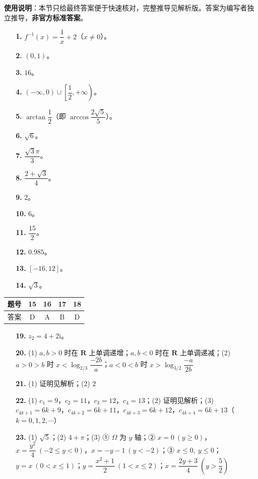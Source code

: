
\begin{gknotice}
\textbf{使用说明}：本节只给最终答案便于快速核对，完整推导见解析版。答案为编写者独立推导，\textbf{非官方标准答案}。
\end{gknotice}

\begin{itemize}[leftmargin=2.6em]
  \item[\textbf{1.}] $f^{-1}(x)=\dfrac1x+2$（$x\neq0$）。
  \item[\textbf{2.}] $(0,1)$。
  \item[\textbf{3.}] $16$。
  \item[\textbf{4.}] $(-\infty,0)\cup\left[\dfrac12,+\infty\right)$。
  \item[\textbf{5.}] $\arctan\dfrac12$（即 $\arccos\dfrac{2\sqrt5}5$）。
  \item[\textbf{6.}] $\sqrt6$。
  \item[\textbf{7.}] $\dfrac{\sqrt3\pi}3$。
  \item[\textbf{8.}] $\dfrac{2+\sqrt3}4$。
  \item[\textbf{9.}] $2$。
  \item[\textbf{10.}] $6$。
  \item[\textbf{11.}] $\dfrac{15}2$。
  \item[\textbf{12.}] $0.985$。
  \item[\textbf{13.}] $[-16,12]$。
  \item[\textbf{14.}] $\sqrt3$。
\end{itemize}

\begin{center}\begin{tabular}{ccccc}
\toprule
题号 & 15 & 16 & 17 & 18 \\
\midrule
答案 & D & A & B & D \\
\bottomrule
\end{tabular}\end{center}

\begin{itemize}[leftmargin=2.6em]
  \item[\textbf{19.}] $z_2=4+2\mathrm i$。
  \item[\textbf{20.}] (1) $a,b>0$ 时在 $\mathbf R$ 上单调递增；$a,b<0$ 时在 $\mathbf R$ 上单调递减；(2) $a>0>b$ 时 $x<\log_{2/3}\dfrac{-2b}{a}$；$a<0<b$ 时 $x>\log_{3/2}\dfrac{-a}{2b}$
  \item[\textbf{21.}] (1) 证明见解析；(2) $2$
  \item[\textbf{22.}] (1) $c_1=9$，$c_2=11$，$c_3=12$，$c_4=13$；(2) 证明见解析；(3) $c_{4k+1}=6k+9$，$c_{4k+2}=6k+11$，$c_{4k+3}=6k+12$，$c_{4k+4}=6k+13$（$k=0,1,2,\cdots$）
  \item[\textbf{23.}] (1) $\sqrt5$；(2) $4+\pi$；(3) ① $\Omega$ 为 $y$ 轴；② $x=0\ (y\geqslant0)$，$x=\dfrac{y^2}4\ (-2\leqslant y<0)$，$x=-y-1\ (y<-2)$；③ $x\leqslant0,\ y\leqslant0$；$y=x\ (0<x\leqslant1)$；$y=\dfrac{x^2+1}2\ (1<x\leqslant2)$；$x=\dfrac{2y+3}4\ \left(y>\dfrac52\right)$
\end{itemize}
